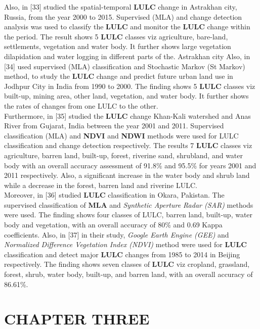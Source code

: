 \documentclass[10pt]{report}
\begin{document}
\begin{flushleft}
		Also, in [33] studied the spatial-temporal \textbf{LULC} change in Astrakhan city, Russia, from the year 2000 to 2015. Supervised (MLA)	and change detection analysis was used to classify the \textbf{LULC} and	monitor the \textbf{LULC} change within the period. The result shows 5	\textbf{LULC} classes viz agriculture, bare-land, settlements, vegetation	and water body. It further shows large vegetation dilapidation and	water logging in different parts of the. Astrakhan city	Also, in [34] used supervised (MLA) classification and Stochastic	Markov (St Markov) method, to study the \textbf{LULC} change and predict future urban land use in Jodhpur City in India from 1990 to	2000. The finding shows 5 \textbf{LULC} classes viz built-up, mining area,	other land, vegetation, and water body. It further shows the rates	of changes from one LULC to the other.\\
		
		Furthermore, in [35] studied the \textbf{LULC} change Khan-Kali watershed and Anas River from Gujarat, India between the year 2001	and 2011. Supervised classification (MLA) and \textbf{NDVI} and \textbf{NDWI}	methods were used for LULC classification and change detection	respectively. The results 7 \textbf{LULC} classes viz agriculture, barren	land, built-up, forest, riverine sand, shrubland, and water body	with an overall accuracy assessment of 91.8\% and 95.5\% for years	2001 and 2011 respectively. Also, a significant increase in the	water body and shrub land while a decrease in the forest, barren
		land and riverine LULC.\\
		
		Moreover, in [36] studied \textbf{LULC} classification in Okara, Pakistan.	The supervised classification of \textbf{MLA} and \emph{Synthetic Aperture Radar (SAR)} methods were used. The finding shows four classes	of LULC, barren land, built-up, water body and vegetation, with	an overall accuracy of 80\% and 0.69 Kappa coefficients.	Also, in [37] in their study, \emph{Google Earth Engine (GEE)} and \emph{Normalized Difference Vegetation Index (NDVI)} method were used	for \textbf{LULC} classification and detect major \textbf{LULC} changes from	1985 to 2014 in Beijing respectively. The finding shows seven	classes of \textbf{LULC} viz cropland, grassland, forest, shrub, water body,	built-up, and barren land, with an overall accuracy of 86.61\%.\\
		\chapter{CHAPTER THREE}

\end{flushleft}
\end{document}
